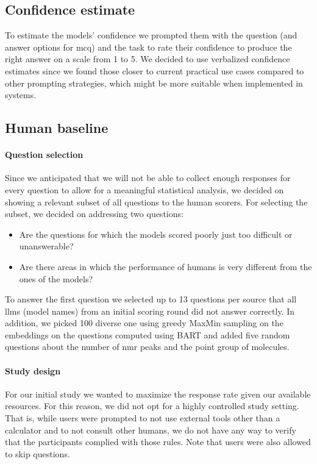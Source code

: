 \documentclass[11pt, oneside]{article}
\begin{document}
\begin{refsection}
\subsection{Confidence estimate}
To estimate the models' confidence we prompted them with the question (and answer options for \gls{mcq}) and the task to rate their confidence to produce the right answer on a scale from 1 to 5. 
We decided to use verbalized confidence estimates\autocite{xiong2023llms} since we found those closer to current practical use cases compared to other prompting strategies, which might be more suitable when implemented in systems.

\subsection{Human baseline}


\paragraph{Question selection} \label{sec:subset-selection}
Since we anticipated that we will not be able to collect enough responses for every question to allow for a meaningful statistical analysis, we decided on showing a relevant subset of all questions to the human scorers.
For selecting the subset, we decided on addressing two questions:
\begin{itemize}
    \item Are the questions for which the models scored poorly just too difficult or unanswerable?
    \item Are there areas in which the performance of humans is very different from the ones of the models?
\end{itemize}
To answer the first question we selected up to 13 questions per source that all \glspl{llm} (model names) from an initial scoring round did not answer correctly.
In addition, we picked 100 diverse one using greedy MaxMin sampling on the embeddings on the questions computed using BART and added five random questions about the number of \gls{nmr} peaks and the point group of molecules.

\paragraph{Study design}
For our initial study we wanted to maximize the response rate given our available resources. 
For this reason, we did not opt for a highly controlled study setting. 
That is, while users were prompted to not use external tools other than a calculator and to not consult other humans, we do not have any way to verify that the participants complied with those rules. 
Note that users were also allowed to skip questions.


\end{refsection}
\end{document}
